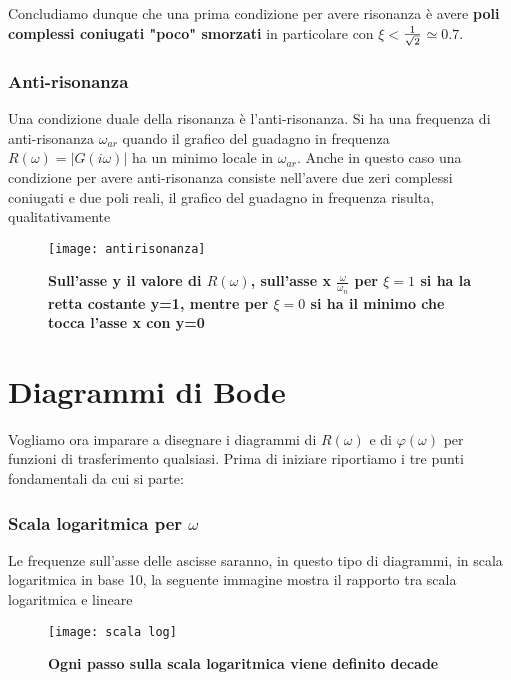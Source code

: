 \documentclass[a4paper]{article}
\begin{document}
	Concludiamo dunque che una prima condizione per avere risonanza è avere \textbf{poli complessi coniugati "poco" smorzati} in particolare con $\xi<$$ 1\over\sqrt{2}$$ \simeq0.7 $.
	\subsubsection{Anti-risonanza}
	Una condizione duale della risonanza è l'anti-risonanza. Si ha una frequenza di anti-risonanza $\omega_{ar}$ quando il grafico del guadagno in frequenza $R(\omega)=|G(i\omega)|$ ha un minimo locale in $\omega_{ar}$.
	Anche in questo caso una condizione per avere anti-risonanza consiste nell'avere due zeri complessi coniugati e due poli reali, il grafico del guadagno in frequenza risulta, qualitativamente
	\begin{figure}[H]
		\centering
		\texttt{[image: antirisonanza]}
		\caption{\textbf{Sull'asse y il valore di $R(\omega)$, sull'asse x $\frac{\omega}{\omega_n}$ per $\xi=1$ si ha la  retta costante y=1, mentre per $\xi=0$ si ha il minimo che tocca l'asse x con y=0 }}
	\end{figure}
	
	
	\section{Diagrammi di Bode}
	Vogliamo ora imparare a disegnare i diagrammi di $R(\omega)$ e di $\varphi(\omega)$ per funzioni di trasferimento qualsiasi. Prima di iniziare riportiamo i tre punti fondamentali da cui si parte:
	
	\subsubsection*{Scala logaritmica per $\omega$}
	Le frequenze sull'asse delle ascisse saranno, in questo tipo di diagrammi, in scala logaritmica in base 10, la seguente immagine mostra il rapporto tra scala logaritmica e lineare
	\begin{figure}[H]
		\centering
	 	\texttt{[image: scala log]}
		\caption{\textbf{Ogni passo sulla scala logaritmica viene definito decade}}
 	\end{figure}
	
\end{document}
